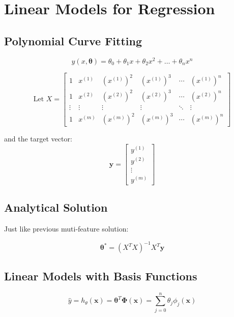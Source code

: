 \section{Linear Models for Regression}

\subsection{Polynomial Curve Fitting}

\begin{equation}
    \hat{y}(x, \boldsymbol{\theta}) = \theta_0 + \theta_1 x + \theta_2 x^2 + \dots + \theta_n x^n
\end{equation}

\begin{equation}
\text{Let } X =
\begin{bmatrix}
1 & x^{(1)} & (x^{(1)})^2 & (x^{(1)})^3 & \cdots & (x^{(1)})^n \\
1 & x^{(2)} & (x^{(2)})^2 & (x^{(2)})^3 & \cdots & (x^{(2)})^n \\
\vdots & \vdots & \vdots & \vdots & \ddots & \vdots \\
1 & x^{(m)} & (x^{(m)})^2 & (x^{(m)})^3 & \cdots & (x^{(m)})^n
\end{bmatrix}
\end{equation}


and the target vector:
\begin{equation}
\mathbf{y} =
\begin{bmatrix}
y^{(1)} \\
y^{(2)} \\
\vdots \\
y^{(m)}
\end{bmatrix}
\end{equation}


\subsection{Analytical Solution}

Just like previous muti-feature solution:

\begin{equation}
\boldsymbol{\theta}^* = (X^T X)^{-1}X^T \mathbf{y}
\end{equation}

\subsection{Linear Models with Basis Functions}
\begin{equation}
    \hat{y} = h_{\theta}(\mathbf{x}) = \boldsymbol{\theta}^T \boldsymbol{\Phi}(\mathbf{x})
    = \sum_{j=0}^{n} \theta_j \phi_j(\mathbf{x})
\end{equation}

